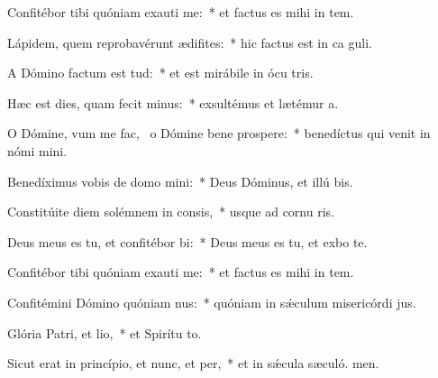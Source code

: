 \item Confitébor tibi quóniam exauti me:~* et factus es mihi in tem.
\item Lápidem, quem reprobavérunt ædifites:~* hic factus est in ca guli.
\item A Dómino factum est tud:~* et est mirábile in ócu tris.
\item Hæc est dies, quam fecit minus:~* exsultémus et lætémur  a.
\item O Dómine, vum me fac,~\pscross{} o Dómine bene prospere:~* benedíctus qui venit in nómi mini.
\item Benedíximus vobis de domo mini:~* Deus Dóminus, et illú bis.
\item Constitúite diem solémnem in consis,~* usque ad cornu ris.
\item Deus meus es tu, et confitébor bi:~* Deus meus es tu, et exbo te.
\item Confitébor tibi quóniam exauti me:~* et factus es mihi in tem.
\item Confitémini Dómino quóniam nus:~* quóniam in sǽculum misericórdi jus.
\item Glória Patri, et lio,~* et Spirítu to.
\item Sicut erat in princípio, et nunc, et per,~* et in sǽcula sæculó. men.
